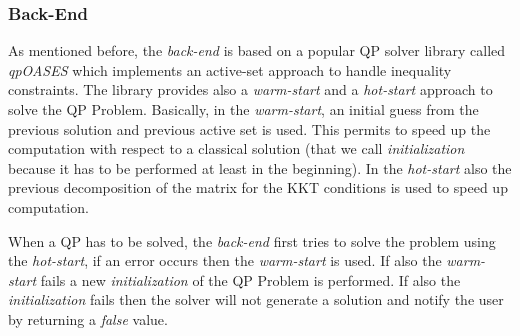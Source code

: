 \subsubsection{Back-End}
As mentioned before, the \emph{back-end} is based on a popular QP solver library called \emph{qpOASES} \cite{ferreau2013} which implements an active-set approach to handle inequality constraints. The library provides also a \emph{warm-start} and a \emph{hot-start} approach to solve the QP Problem. Basically, in the \emph{warm-start}, an initial guess from the previous solution and previous active set is used. This permits to speed up the computation with respect to a classical solution (that we call \emph{initialization} because it has to be performed at least in the beginning).
In the \emph{hot-start} also the previous decomposition of the matrix for the KKT conditions is used to speed up computation. 


When a QP has to be solved, the \emph{back-end} first tries to solve the problem using the \emph{hot-start}, if an error occurs then the \emph{warm-start} is used. If also the \emph{warm-start} fails a new \emph{initialization} of the QP Problem is performed. If also the \emph{initialization} fails then the solver will not generate a solution and notify the user by returning a \emph{false} value.



